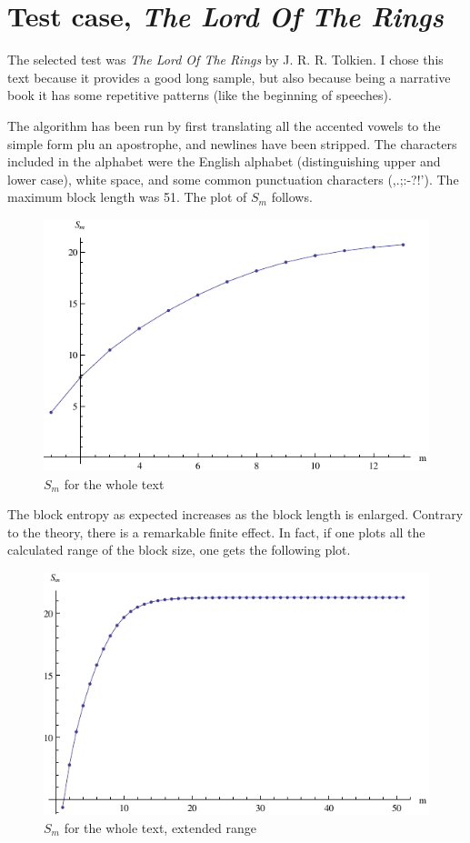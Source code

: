 \documentclass[conference]{IEEEtran}
\begin{document}
\section{Test case, \emph{The Lord Of The Rings}}

The selected test was \emph{The Lord Of The Rings} by J. R. R. Tolkien. I chose this text because it provides a good long sample, but also because being a narrative book it has some repetitive patterns (like the beginning of speeches).

The algorithm has been run by first translating all the accented vowels to the simple form plu an apostrophe, and newlines have been stripped. The characters included in the alphabet were the English alphabet (distinguishing upper and lower case), white space, and some common punctuation characters (,.;:-?!'). The maximum block length was 51. The plot of $S_m$ follows.

\begin{figure}[h]
\centering
\includegraphics{Sm.pdf}
\caption{$S_m$ for the whole text}
\end{figure}

The block entropy as expected increases as the block length is enlarged. Contrary to the theory, there is a remarkable finite effect. In fact, if one plots all the calculated range of the block size, one gets the following plot.

\begin{figure}[h]
\centering
\includegraphics{Sm-extend.pdf}
\caption{$S_m$ for the whole text, extended range}
\end{figure}
\end{document}
